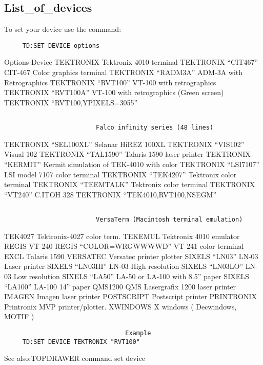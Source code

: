 \subsection{List\_of\_devices}
To set your device use the command:  
\begin{verbatim}
     TD:SET DEVICE options 
\end{verbatim}
Options                  Device 
TEKTRONIX                Tektronix 4010 terminal 
TEKTRONIX ``CIT467''       CIT-467 Color graphics terminal 
TEKTRONIX ``RADM3A''       ADM-3A with Retrographics 
TEKTRONIX ``RVT100''       VT-100 with retrographics 
TEKTRONIX ``RVT100A''      VT-100 with retrographics (Green screen) 
TEKTRONIX ``RVT100,YPIXELS=3055''
\begin{verbatim}
                         
                         Falco infinity series (48 lines) 
\end{verbatim}
TEKTRONIX ``SEL100XL''     Selanar HiREZ 100XL 
TEKTRONIX ``VIS102''       Visual 102 
TEKTRONIX ``TAL1590''      Talaris 1590 laser printer 
TEKTRONIX ``KERMIT''       Kermit simulation of TEK-4010 with color 
TEKTRONIX ``LSI7107''      LSI model 7107 color terminal 
TEKTRONIX ``TEK4207''      Tektronix color terminal 
TEKTRONIX ``TEEMTALK''     Tektronix color terminal 
TEKTRONIX ``VT240''        C.ITOH 328 
TEKTRONIX                ``TEK4010,RVT100,NSEGM''
\begin{verbatim}
                         
                         VersaTerm (Macintosh terminal emulation) 
\end{verbatim}
TEK4027                  Tektronix-4027 color term.  
TEKEMUL                  Tektronix 4010 emulator 
REGIS                    VT-240 
REGIS ``COLOR=WRGWWWWD''   VT-241 color terminal 
EXCL                     Talaris 1590 
VERSATEC                 Versatec printer plotter 
SIXELS ``LN03''            LN-03 Laser printer 
SIXELS ``LN03HI''          LN-03 High resolution 
SIXELS ``LN03LO''          LN-03 Low resolution 
SIXELS ``LA50''            LA-50 or LA-100 with 8.5'' paper 
SIXELS ``LA100''           LA-100 14'' paper 
QMS1200                  QMS Lasergrafix 1200 laser printer 
IMAGEN                   Imagen laser printer 
POSTSCRIPT               Postscript printer 
PRINTRONIX               Printronix MVP printer/plotter.  
XWINDOWS X windows ( Decwindows, MOTIF ) 

\begin{verbatim}
                                 Example
     TD:SET DEVICE TEKTRONIX "RVT100" 
\end{verbatim}
See also:TOPDRAWER command set device 
